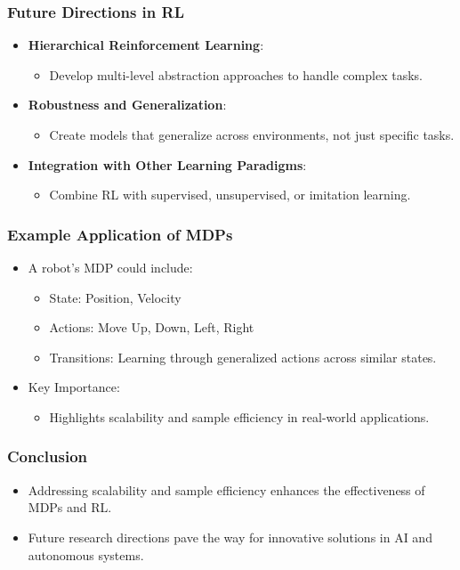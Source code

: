 \documentclass[aspectratio=169]{beamer}
\begin{document}
\begin{frame}[fragile]
    \frametitle{Future Directions in RL}
    \begin{itemize}
        \item \textbf{Hierarchical Reinforcement Learning}:
        \begin{itemize}
            \item Develop multi-level abstraction approaches to handle complex tasks.
        \end{itemize}
        \item \textbf{Robustness and Generalization}:
        \begin{itemize}
            \item Create models that generalize across environments, not just specific tasks.
        \end{itemize}
        \item \textbf{Integration with Other Learning Paradigms}:
        \begin{itemize}
            \item Combine RL with supervised, unsupervised, or imitation learning.
        \end{itemize}
    \end{itemize}
\end{frame}

\begin{frame}[fragile]
    \frametitle{Example Application of MDPs}
    \begin{itemize}
        \item A robot's MDP could include:
        \begin{itemize}
            \item State: Position, Velocity
            \item Actions: Move Up, Down, Left, Right
            \item Transitions: Learning through generalized actions across similar states.
        \end{itemize}
        \item Key Importance:
        \begin{itemize}
            \item Highlights scalability and sample efficiency in real-world applications.
        \end{itemize}
    \end{itemize}
\end{frame}

\begin{frame}[fragile]
    \frametitle{Conclusion}
    \begin{itemize}
        \item Addressing scalability and sample efficiency enhances the effectiveness of MDPs and RL.
        \item Future research directions pave the way for innovative solutions in AI and autonomous systems.
    \end{itemize}
\end{frame}
\end{document}
